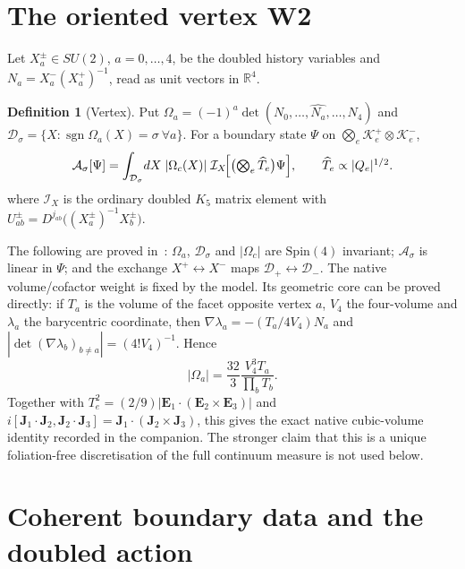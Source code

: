 \documentclass[11pt]{article}
\numberwithin{equation}{section}
\theoremstyle{definition}
\newtheorem{definition}[theorem]{Definition}
\theoremstyle{remark}
\newcommand{\SUtwo}{SU(2)}
\newcommand{\SpinFour}{\mathrm{Spin}(4)}
\newcommand{\Dom}{\mathcal D}
\begin{document}
\section{The oriented vertex W2}\label{sec:w2}

Let $X_a^\pm\in\SUtwo$, $a=0,\dots,4$, be the doubled history variables and
$N_a=X_a^-(X_a^+)^{-1}$, read as unit vectors in $\mathbb R^4$.

\begin{definition}[Vertex]\label{def:w2}
Put $\Omega_a=(-1)^a\det(N_0,\dots,\widehat{N_a},\dots,N_4)$ and
$\Dom_\sigma=\{X:\operatorname{sgn}\Omega_a(X)=\sigma\ \forall a\}$. For a boundary
state $\Psi$ on $\bigotimes_e\mathcal K_e^+\otimes\mathcal K_e^-$,
\[
\mathcal A_\sigma[\Psi]
=\int_{\Dom_\sigma}\!dX\;|\Omega_c(X)|\;
\mathcal I_X\!\Bigl[\bigl(\textstyle\bigotimes_e\widehat T_e\bigr)\Psi\Bigr],
\qquad \widehat T_e\propto|Q_e|^{1/2}.
\]
where $\mathcal I_X$ is the ordinary doubled $K_5$ matrix element with
$U^\pm_{ab}=D^{j_{ab}}\bigl((X_a^\pm)^{-1}X_b^\pm\bigr)$.
\end{definition}

The following are proved in~\cite{W2vertex}: $\Omega_a$, $\Dom_\sigma$ and
$|\Omega_c|$ are $\SpinFour$ invariant; $\mathcal A_\sigma$ is linear in $\Psi$;
and the exchange $X^+\leftrightarrow X^-$ maps
$\Dom_+\leftrightarrow\Dom_-$. The native volume/cofactor weight is fixed by
the model. Its geometric core can be proved directly: if $T_a$ is the volume of
the facet opposite vertex $a$, $V_4$ the four-volume and $\lambda_a$ the
barycentric coordinate, then
$\nabla\lambda_a=-(T_a/4V_4)N_a$ and
$|\det(\nabla\lambda_b)_{b\ne a}|=(4!V_4)^{-1}$. Hence
\[
 |\Omega_a|
 =\frac{32}{3}\frac{V_4^3T_a}{\prod_bT_b}.
\]
Together with
$T_e^2=(2/9)|\mathbf E_1\!\cdot(\mathbf E_2\times\mathbf E_3)|$
and
$i[\mathbf J_1\!\cdot\!\mathbf J_2,\mathbf J_2\!\cdot\!\mathbf J_3]
=\mathbf J_1\!\cdot\!(\mathbf J_2\times\mathbf J_3)$,
this gives the exact native cubic-volume identity recorded in the companion.
The stronger claim that this is a unique foliation-free discretisation of the
full continuum measure is not used below.

\section{Coherent boundary data and the doubled action}\label{sec:action}
\end{document}
